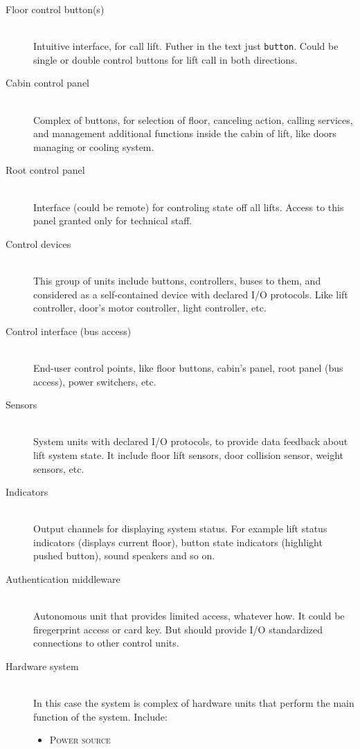 \documentclass[a4paper,11pt]{article}
\begin{document}
\begin{description}
  \item[Floor control button(s)] \hfill\\
  Intuitive interface, for call lift. Futher in the text just \texttt{button}. Could be single or double control buttons for lift call in both directions.
  \item[Cabin control panel] \hfill\\
  Complex of buttons, for selection of floor, canceling action, calling services, and management additional functions inside the cabin of lift, like doors managing or cooling system.
  \item[Root control panel] \hfill\\
  Interface (could be remote) for controling state off all lifts. Access to this panel granted only for technical staff.
  \item[Control devices] \hfill\\
  This group of units include buttons, controllers, buses to them, and considered as a self-contained device with declared I/O protocols. Like lift controller, door's motor controller, light controller, etc.
  \item[Control interface (bus access)] \hfill\\
  End-user control points, like floor buttons, cabin's panel, root panel (bus access), power switchers, etc.
  \item[Sensors] \hfill\\
  System units with declared I/O protocols, to provide data feedback about lift system state. It include floor lift sensors, door collision sensor, weight sensors, etc.
  \item[Indicators] \hfill\\
  Output channels for displaying system status. For example lift status indicators (displays current floor), button state indicators (highlight pushed button), sound speakers and so on.
  \item[Authentication middleware] \hfill\\
  Autonomous unit that provides limited access, whatever how. It could be firegerprint access or card key. But should provide I/O standardized connections to other control units.
  \item[Hardware system] \hfill\\
  In this case the system is complex of hardware units that perform the main function of the system. Include:
  \begin{itemize}
    \item \textsc{Power source}

\end{itemize}
\end{description}
\end{document}
